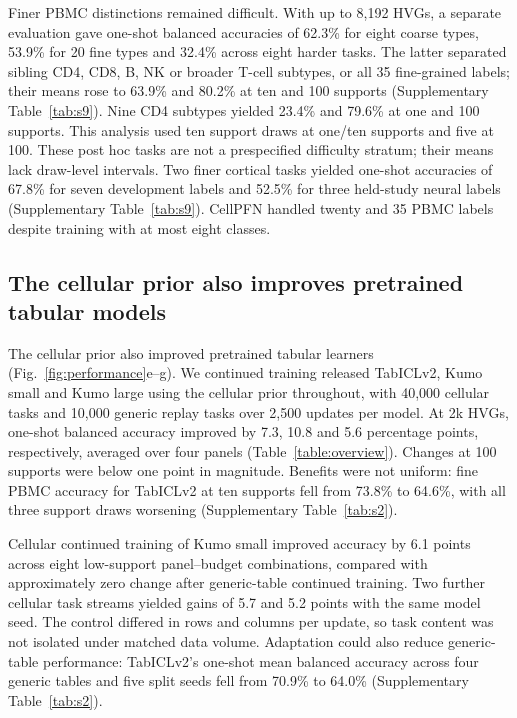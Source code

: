 Finer PBMC distinctions remained difficult. With up to 8,192 HVGs, a separate evaluation gave one-shot balanced accuracies of 62.3\% for eight coarse types, 53.9\% for 20 fine types and 32.4\% across eight harder tasks. The latter separated sibling CD4, CD8, B, NK or broader T-cell subtypes, or all 35 fine-grained labels; their means rose to 63.9\% and 80.2\% at ten and 100 supports (Supplementary Table~\ref{tab:s9}). Nine CD4 subtypes yielded 23.4\% and 79.6\% at one and 100 supports. This analysis used ten support draws at one/ten supports and five at 100. These post hoc tasks are not a prespecified difficulty stratum; their means lack draw-level intervals. Two finer cortical tasks yielded one-shot accuracies of 67.8\% for seven development labels and 52.5\% for three held-study neural labels (Supplementary Table~\ref{tab:s9}). CellPFN handled twenty and 35 PBMC labels despite training with at most eight classes.


\subsection*{The cellular prior also improves pretrained tabular models}

The cellular prior also improved pretrained tabular learners (Fig.~\ref{fig:performance}e--g). We continued training released TabICLv2, Kumo small and Kumo large using the cellular prior throughout, with 40,000 cellular tasks and 10,000 generic replay tasks over 2,500 updates per model. At 2k HVGs, one-shot balanced accuracy improved by 7.3, 10.8 and 5.6 percentage points, respectively, averaged over four panels (Table~\ref{table:overview}). Changes at 100 supports were below one point in magnitude. Benefits were not uniform: fine PBMC accuracy for TabICLv2 at ten supports fell from 73.8\% to 64.6\%, with all three support draws worsening (Supplementary Table~\ref{tab:s2}).

Cellular continued training of Kumo small improved accuracy by 6.1 points across eight low-support panel--budget combinations, compared with approximately zero change after generic-table continued training. Two further cellular task streams yielded gains of 5.7 and 5.2 points with the same model seed. The control differed in rows and columns per update, so task content was not isolated under matched data volume. Adaptation could also reduce generic-table performance: TabICLv2's one-shot mean balanced accuracy across four generic tables and five split seeds fell from 70.9\% to 64.0\% (Supplementary Table~\ref{tab:s2}).

